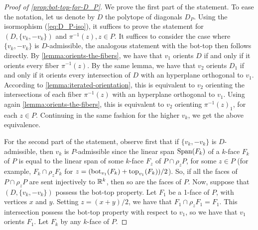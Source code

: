 \begin{proof}[Proof of \cref{prop:bot-top-for-D_P}]
	We prove the first part of the statement.
	To ease the notation, let us denote by $D$ the polytope of diagonals $D_P$.
	Using the isormophism (\ref{eq:D_P-iso}), it suffices to prove the statement for $(D,\{v_k,-v_k\})$ and $\pi^{-1}(z), z \in P$.
	It suffices to consider the case where $\{v_k,-v_k\}$ is $D$-admissible, the analogous statement with the bot-top then follows directly.
	By \cref{lemma:orients-the-fibers}, we have that $v_1$ orients $D$ if and only if it orients every fiber $\pi^{-1}(z)$.
	By the same lemma, we have that $v_2$ orients $D_1$ if and only if it orients every intersection of $D$ with an hyperplane orthogonal to $v_1$.
	According to \cref{lemma:iterated-orientation}, this is equivalent to $v_2$ orienting the intersections of each fiber $\pi^{-1}(z)$ with an hyperplane orthogonal to $v_1$.
	Using again \cref{lemma:orients-the-fibers}, this is equivalent to $v_2$ orienting $\pi^{-1}(z)_1$, for each $z \in P$.
	Continuing in the same fashion for the higher $v_k$, we get the above equivalence.

	For the second part of the statement, observe first that if $\{v_k,-v_k\}$ is $D$-admissible, then $v_k$ is $P$-admissible since the linear span $\operatorname{\mathrm{Span}}(F_k)$ of a $k$-face $F_k$ of $P$ is equal to the linear span of some $k$-face $F_z$ of $P\cap \rho_z P$, for some $z \in P$ (for example, $F_k \cap \rho_z F_k$ for $z=(\operatorname{bot}_{v_1}(F_k)+\operatorname{top}_{v_1}(F_k))/2$).
	So, if all the faces of $P\cap \rho_z P$ are sent injectively to $\mathbb{R}^k$, then so are the faces of $P$.
	Now, suppose that $(D,\{v_k,-v_k\})$ possess the bot-top property.
	Let $F_1$ be a 1-face of $P$, with vertices $x$ and $y$.
	Setting $z=(x+y)/2$, we have that $F_1 \cap \rho_z F_1 = F_1$.
	This intersection possess the bot-top property with respect to $v_1$, so we have that $v_1$ orients $F_1$.
	Let $F_k$ by any $k$-face of $P$. 
\end{proof}






